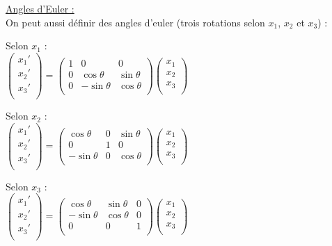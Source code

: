 \documentclass[../main.tex]{subfiles}
\begin{document}
\quad \underline{Angles d'Euler :}\\
On peut aussi définir des angles d'euler (trois rotations selon $x_1$, $x_2$ et $x_3$) :\\
\begin{minipage}{.5\textwidth}
    Selon $x_1$ : \\
$\begin{pmatrix}
    x_1'\\
    x_2'\\
    x_3'\\
\end{pmatrix} = \begin{pmatrix}
    1&0&0\\
    0&\cos{\theta} & \sin{\theta}\\
    0&-\sin{\theta} & \cos{\theta}\\
\end{pmatrix} \begin{pmatrix}
    x_1\\
    x_2\\
    x_3\\
\end{pmatrix}$\\
\end{minipage}
\vline
\begin{minipage}{.5\textwidth}
    Selon $x_2$ :\\
$\begin{pmatrix}
    x_1'\\
    x_2'\\
    x_3'\\
\end{pmatrix} = \begin{pmatrix}
    \cos{\theta}&0&\sin{\theta}\\
    0&1 & 0\\
    -\sin{\theta} &0& \cos{\theta}\\
\end{pmatrix} \begin{pmatrix}
    x_1\\
    x_2\\
    x_3\\
\end{pmatrix}$\\
\end{minipage}
Selon $x_3$ :\\
$\begin{pmatrix}
    x_1'\\
    x_2'\\
    x_3'\\
\end{pmatrix} = \begin{pmatrix}
    \cos{\theta} & \sin{\theta} &0\\
    -\sin{\theta} & \cos{\theta}&0\\
    0&0&1\\
\end{pmatrix} \begin{pmatrix}
    x_1\\
    x_2\\
    x_3\\
\end{pmatrix}$\\
\end{document}
